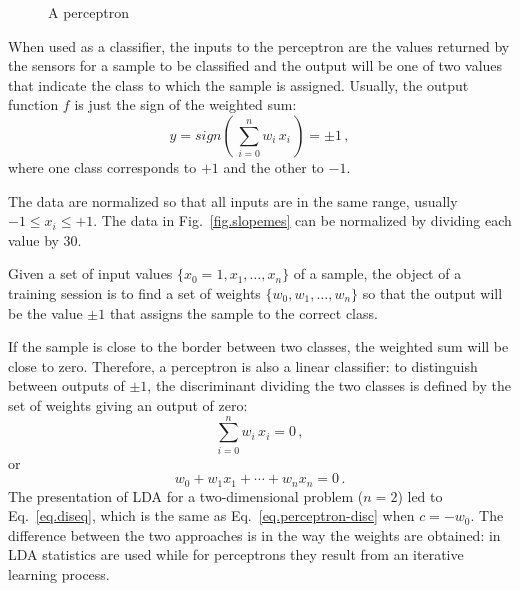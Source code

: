 \begin{figure}
\begin{center}
\end{center}
\caption{A perceptron}\label{fig.perceptron}
\end{figure}

When used as a classifier, the inputs to the perceptron are the values returned by the sensors for a sample to be classified and the output will be one of two values that indicate the class to which the sample is assigned. Usually, the output function $f$ is just the sign of the weighted sum:
\begin{equation}
y=sign\left(\,\sum_{i=0}^{n} w_i\,x_i\,\right)=\pm 1\,,\label{eq.perceptron-output}
\end{equation}
where one class corresponds to $+1$ and the other to $-1$.

The data are normalized so that all inputs are in the same range, usually $-1\leq x_i\leq +1$. The data in Fig.~\ref{fig.slopemes} can be normalized by dividing each value by $30$.

Given a set of input values $\{x_0=1,x_1,\ldots,x_n\}$ of a sample, the object of a training session is to find a set of weights $\{w_0,w_1,\ldots,w_n\}$ so that the output will be the value $\pm 1$ that assigns the sample to the correct class.

If the sample is close to the border between two classes, the weighted sum will be close to zero. Therefore, a perceptron is also a linear classifier: to distinguish between outputs of $\pm 1$, the discriminant dividing the two classes is defined by the set of weights giving an output of zero:
\[
\sum_{i=0}^{n} w_i\,x_i=0\,,
\]
or
\begin{equation}
w_0 + w_1x_1 + \cdots + w_nx_n = 0\,.\label{eq.perceptron-disc}
\end{equation}
The presentation of LDA for a two-dimensional problem ($n=2$) led to Eq.~\ref{eq.diseq}, which is the same as Eq.~\ref{eq.perceptron-disc} when $c=-w_0$. The difference between the two approaches is in the way the weights are obtained: in LDA statistics are used while for perceptrons they result from an iterative learning process.

